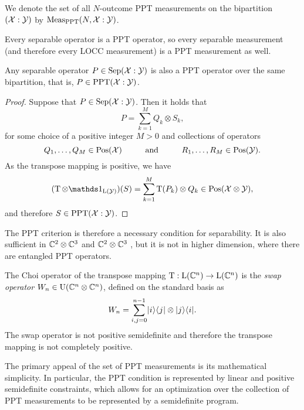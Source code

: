 We denote the set of all $N$-outcome PPT measurements on the bipartition 
$(\mathcal{X}:\mathcal{Y})$ by $\mathrm{Meas}_{\mathrm{PPT}}(N, \mathcal{X}:\mathcal{Y})$.

Every separable operator is a PPT operator, so every separable measurement
(and therefore every LOCC measurement) is a PPT measurement as well. 

\begin{theorem}
Any separable operator $P \in \mathrm{Sep}(\mathcal{X}:\mathcal{Y})$ is also a PPT operator over the same
bipartition, that is, $P \in \mathrm{PPT}(\mathcal{X}:\mathcal{Y})$.
\end{theorem}
\begin{proof}
Suppose that $P \in \mathrm{Sep}(\mathcal{X}:\mathcal{Y})$. Then it holds that
\begin{equation}
  P = \sum_{k = 1}^{M} Q_k \otimes S_k,
\end{equation}
for some choice of a positive integer $M > 0$ and collections of operators 
\begin{equation}
  Q_1,\ldots,Q_M \in \mathrm{Pos}(\mathcal{X})
  \hspace*{1cm}\mbox{and}\hspace*{1cm}
  R_1,\ldots,R_M\in\mathrm{Pos}(\mathcal{Y}).
\end{equation}
As the transpose mapping is positive, we have
\begin{equation}
  (\pt \otimes \I_{\Lin(\Y)})(S) = \sum_{k=1}^{M}\pt(P_{k})\otimes Q_{k} 
    \in \Pos(\X\otimes\Y),
\end{equation}
and therefore $S \in \mathrm{PPT}(\mathcal{X}:\mathcal{Y})$.
\end{proof}

The PPT criterion is therefore a necessary condition for separability. It is 
also sufficient in $\mathbb{C}^{2}\otimes\mathbb{C}^{3}$ and $\mathbb{C}^{2}\otimes\mathbb{C}^{3}$ 
\cite{Peres1996,Horodecki1996}, but it is not in higher dimension, 
where there are entangled PPT operators. 

The Choi operator of the transpose mapping $\operatorname{T} : \mathrm{L}(\mathbb{C}^{n})\to\mathrm{L}(\mathbb{C}^{n})$
is the \emph{swap operator} 
$W_{n} \in \mathrm{U}(\mathbb{C}^{n}\otimes\mathbb{C}^{n})$, defined on the standard basis as
\begin{equation}
\label{eq:swap-operator}
  W_{n} = \sum_{i,j=0}^{n-1}\lvert\mspace{0.5mu} i \mspace{0.5mu} \rangle\langle\mspace{0.5mu} j \mspace{0.5mu} \rvert\otimes\lvert\mspace{0.5mu} j \mspace{0.5mu} \rangle\langle\mspace{0.5mu} i \mspace{0.5mu} \rvert.
\end{equation}
The swap operator is not positive semidefinite and therefore the transpose
mapping is not completely positive.

The primary appeal of the set of PPT measurements is its mathematical simplicity.
In particular, the PPT condition is represented by linear and positive
semidefinite constraints, which allows for an optimization over the collection
of PPT measurements to be represented by a semidefinite program.

